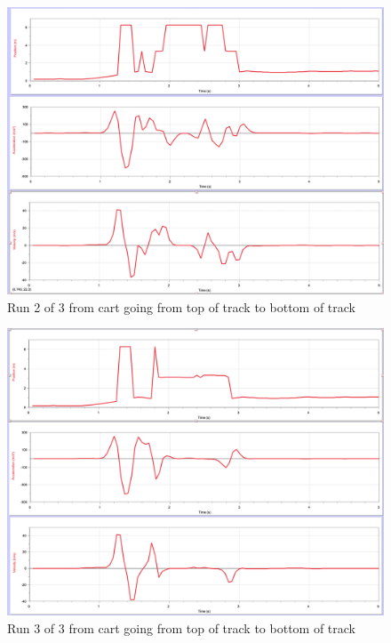 \documentclass[idxtotoc,hyperref,openany]{labbook} %
\begin{document}
\begin{figure}[H] %
\begin{center}
\includegraphics[width=1\linewidth]{images/Lab.02/GoDown2.png}
\end{center}
\caption{Run 2 of 3 from cart going from top of track to bottom of track}
\label{fig:Data of Cart GoDown2}
\end{figure}

\begin{figure}[H] %
\begin{center}
\includegraphics[width=1\linewidth]{images/Lab.02/GoDown3.png}
\end{center}
\caption{Run 3 of 3 from cart going from top of track to bottom of track}
\label{fig:Data of Cart GoDown3}
\end{figure}
\end{document}
